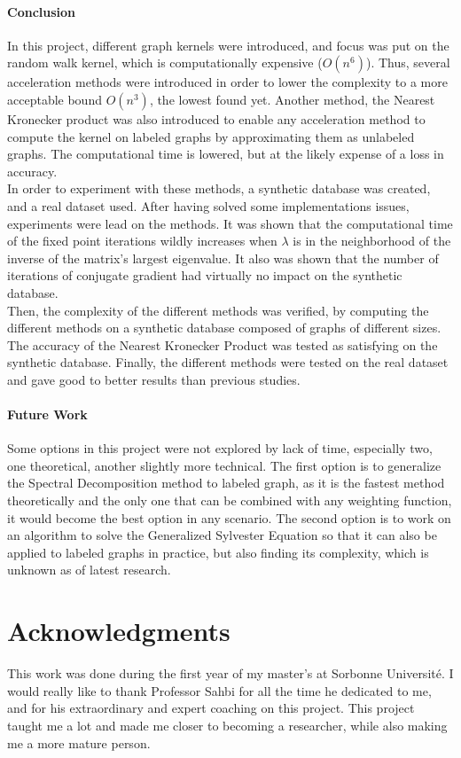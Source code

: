 \documentclass{article}
\theoremstyle{definition}
\begin{document}
\paragraph{Conclusion}
In this project, different graph kernels were introduced, and focus was put on the random walk kernel, which is computationally expensive ($O(n^6)$). Thus, several acceleration methods were introduced in order to lower the complexity to a more acceptable bound $O(n^3)$, the lowest found yet. Another method, the Nearest Kronecker product was also introduced to enable any acceleration method to compute the kernel on labeled graphs by approximating them as unlabeled graphs. The computational time is lowered, but at the likely expense of a loss in accuracy.\\
In order to experiment with these methods, a synthetic database was created, and a real dataset used. After having solved some implementations issues, experiments were lead on the methods. It was shown that the computational time of the fixed point iterations wildly increases when $\lambda$ is in the neighborhood of the inverse of the matrix's largest eigenvalue. It also was shown that the number of iterations of conjugate gradient had virtually no impact on the synthetic database.\\
Then, the complexity of the different methods was verified, by computing the different methods on a synthetic database composed of graphs of different sizes. The accuracy of the Nearest Kronecker Product was tested as satisfying on the synthetic database. Finally, the different methods were tested on the real dataset and gave good to better results than previous studies.
\paragraph{Future Work}
Some options in this project were not explored by lack of time, especially two, one theoretical, another slightly more technical. The first option is to generalize the Spectral Decomposition method to labeled graph, as it is the fastest method theoretically and the only one that can be combined with any weighting function, it would become the best option in any scenario. The second option is to work on an algorithm to solve the Generalized Sylvester Equation so that it can also be applied to labeled graphs in practice, but also finding its complexity, which is unknown as of latest research.

\section*{Acknowledgments}
This work was done during the first year of my master's at Sorbonne Université. I would really like to thank Professor Sahbi for all the time he dedicated to me, and for his extraordinary and expert coaching on this project. This project taught me a lot and made me closer to becoming a researcher, while also making me a more mature person.
\end{document}
